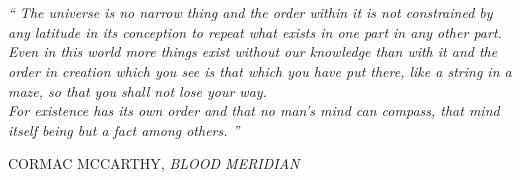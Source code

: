 
\updateRibbons{\textbf{\TEXTquotation}}{}
\chapter*{\hyperlink{toc}{}}
\chaptermark{\TEXTquotation}

\thispagestyle{empty}
\null\vfill

\newlength\longest

\settowidth{} %


\begin{center}
  \centering
  \parbox{\longest}{%
    \raggedright{\large\itshape%
    ``%
    The universe is no narrow thing and the order within it is not constrained by any latitude in its conception to repeat what exists in one part in any other part. Even in this world more things exist without our knowledge than with it and the order in creation which you see is that which you have put there, like a string in a maze, so that you shall not lose your way.\\
    For existence has its own order and that no man's mind can compass, that mind itself being but a fact among others.%
    ''%
    \par\bigskip\bigskip
    }
    \color{wrtxColorPrimary}\raggedleft\normalsize\MakeUppercase{
      Cormac McCarthy, \textit{Blood Meridian}
      }
      \par%
  }
\end{center}

\vfill\vfill\vfill


